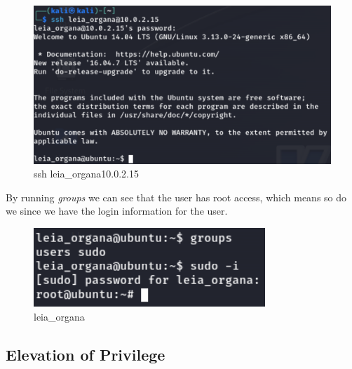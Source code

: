 \begin{figure}[H]
    \centering
    \includegraphics[width=0.8\linewidth]{pic/ssh leia_organa@10.0.2.15.png}
    \caption{ssh leia\_organa\@10.0.2.15}
    \label{fig:ssh leia_organa@10.0.2.15}
\end{figure}

By running \textit{groups} we can see that the user has root access, which means so do we since
we have the login information for the user.


\begin{figure}[H]
    \centering
    \includegraphics[width=0.4\linewidth]{pic/leia_organa.png}
    \caption{leia\_organa}
    \label{fig:leia_organa}
\end{figure}








\subsection{Elevation of Privilege}

